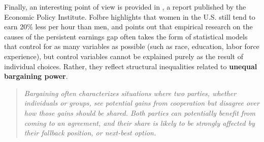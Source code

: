 Finally, an interesting point of view is provided in \cite{folbre2021gender}, a report published by the Economic Policy Institute. Folbre highlights that women in the U.S. still tend to earn 20\% less per hour than men, and points out that empirical research on the causes of the persistent earnings gap often takes the form of statistical models that control for as many variables as possible (such as race, education, labor force experience), but control variables cannot be explained purely as the result of individual choices. Rather, they reflect structural inequalities related to \textbf{unequal bargaining power}.
\begin{quote}\emph{Bargaining often characterizes situations where two parties, whether individuals or groups, see potential gains from cooperation but disagree over how those gains should be shared. Both parties can potentially benefit from coming to an agreement, and their share is likely to be strongly affected by their fallback position, or next-best option.} \cite[p.~9]{folbre2021gender}
\end{quote}

